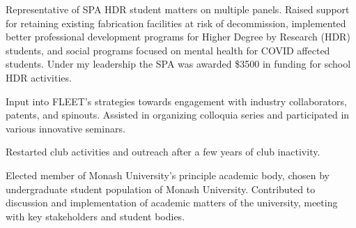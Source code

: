 \documentclass[10pt,a4paper,ragged2e,withhyper]{altacv}
\begin{document}
		Representative of SPA HDR student matters on multiple panels. Raised support for retaining existing fabrication facilities at risk of decommission, implemented better professional development programs for Higher Degree by Research (HDR) students, and social programs focused on mental health for COVID affected students. Under my leadership the SPA was awarded \$3500 in funding for school HDR activities.
		
		\divider
		
		Input into FLEET’s strategies towards engagement with industry collaborators, patents, and spinouts. Assisted in organizing colloquia series and participated in various innovative seminars.
		
		\divider
		
		Restarted club activities and outreach after a few years of club inactivity.
		
		\divider
		
		Elected member of Monash University’s principle academic body, chosen by undergraduate student population of Monash University. Contributed to discussion and implementation of academic matters of the university, meeting with key stakeholders and student bodies.
		
		
		
		
\end{document}
